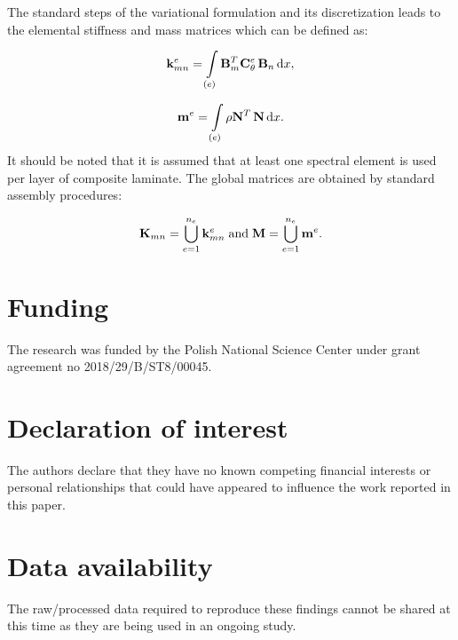 The standard steps of the variational formulation and its discretization leads to the elemental stiffness and mass matrices which can be defined as:
	 
\begin{equation}
	 \mathbf{k}_{mn}^e= \int \limits_{(e)} \mathbf{B}_m^{T} \mathbf{C}_{\theta}^e \, \mathbf{B}_n\, \mathrm{d} x ,
	\label{eq:stiffness_matrix}\end{equation}
	 
\begin{equation}
	 \mathbf{m}^e= \int \limits_{(e)}\rho \mathbf{N}^{T} \, \mathbf{N}\, \mathrm{d} x .
 	\end{equation}
 It should be noted that it is assumed that at least one spectral element is used per layer of composite laminate.
 The global matrices are obtained by standard assembly procedures:
 	
\begin{equation}
 	\mathbf{K}_{mn}= \bigcup_{e=1}^{n_e} \mathbf{k}_{mn}^{e} \; \textrm{and} \; \mathbf{M}= \bigcup_{e=1}^{n_e} \mathbf{m}^{e}. 
 	\end{equation}
	
	
\section*{Funding}
 The research was funded by the Polish National Science Center under grant agreement no 2018/29/B/ST8/00045. 
	

\section*{Declaration of interest}
The authors declare that they have no known competing financial interests or personal relationships that could have appeared to influence the work reported in this paper.
	

\section*{Data availability}
The raw/processed data required to reproduce these findings cannot be shared at this time as they are being used in an ongoing study.
	
    
	


